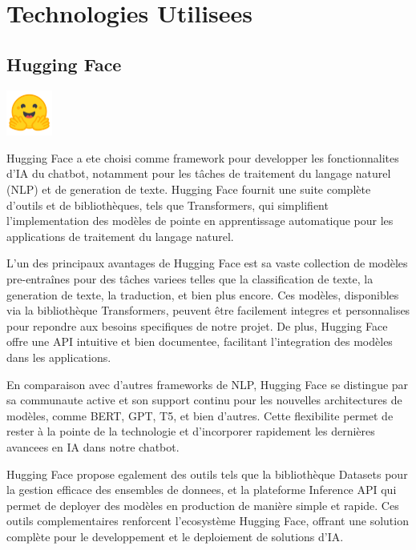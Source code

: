 \documentclass[a4paper, 11pt, openany]{report}
\begin{document}
\newpage

\section{Technologies Utilisees}

\subsection{Hugging Face}
\begin{center}
\includegraphics[height=1.5cm]{face.png}
\end{center}

Hugging Face a ete choisi comme framework pour developper les fonctionnalites d'IA du chatbot, notamment pour les tâches de traitement du langage naturel (NLP) et de generation de texte. Hugging Face fournit une suite complète d'outils et de bibliothèques, tels que Transformers, qui simplifient l'implementation des modèles de pointe en apprentissage automatique pour les applications de traitement du langage naturel.

L'un des principaux avantages de Hugging Face est sa vaste collection de modèles pre-entraînes pour des tâches variees telles que la classification de texte, la generation de texte, la traduction, et bien plus encore. Ces modèles, disponibles via la bibliothèque Transformers, peuvent être facilement integres et personnalises pour repondre aux besoins specifiques de notre projet. De plus, Hugging Face offre une API intuitive et bien documentee, facilitant l'integration des modèles dans les applications.

En comparaison avec d'autres frameworks de NLP, Hugging Face se distingue par sa communaute active et son support continu pour les nouvelles architectures de modèles, comme BERT, GPT, T5, et bien d'autres. Cette flexibilite permet de rester à la pointe de la technologie et d'incorporer rapidement les dernières avancees en IA dans notre chatbot.

Hugging Face propose egalement des outils tels que la bibliothèque Datasets pour la gestion efficace des ensembles de donnees, et la plateforme Inference API qui permet de deployer des modèles en production de manière simple et rapide. Ces outils complementaires renforcent l'ecosystème Hugging Face, offrant une solution complète pour le developpement et le deploiement de solutions d'IA.
\end{document}
